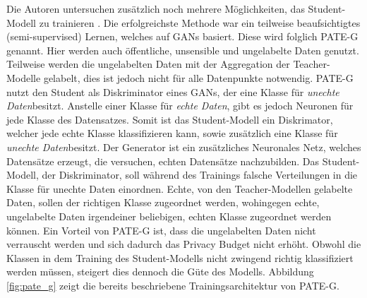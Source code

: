 Die Autoren untersuchen zusätzlich noch mehrere Möglichkeiten, das Student-Modell zu trainieren  \cite{P-57}.
Die erfolgreichste Methode war ein teilweise beaufsichtigtes (semi-supervised) Lernen, welches auf GANs basiert.
Diese wird folglich PATE-G genannt.
Hier werden auch öffentliche, unsensible und ungelabelte Daten genutzt.
Teilweise werden die ungelabelten Daten mit der Aggregation der Teacher-Modelle gelabelt, dies ist jedoch nicht für alle Datenpunkte notwendig.
PATE-G nutzt den Student als Diskriminator eines GANs, der eine Klasse für \dq \textit{unechte Daten}\dq besitzt. 
Anstelle einer Klasse für \dq \textit{echte Daten}\dq, gibt es jedoch Neuronen für jede Klasse des Datensatzes.
Somit ist das Student-Modell ein Diskrimator, welcher jede echte Klasse klassifizieren kann, sowie zusätzlich eine Klasse für \dq \textit{unechte Daten}\dq besitzt.
Der Generator ist ein zusätzliches Neuronales Netz, welches Datensätze erzeugt, die versuchen, echten Datensätze nachzubilden.
Das Student-Modell, der Diskriminator, soll während des Trainings falsche Verteilungen in die Klasse für unechte Daten einordnen.
Echte, von den Teacher-Modellen gelabelte Daten, sollen der richtigen Klasse zugeordnet werden, wohingegen echte, ungelabelte Daten irgendeiner beliebigen, echten Klasse zugeordnet werden können.
Ein Vorteil von PATE-G ist, dass die ungelabelten Daten nicht verrauscht werden und sich dadurch das Privacy Budget nicht erhöht.
Obwohl die Klassen in dem Training des Student-Modells nicht zwingend richtig klassifiziert werden müssen, steigert dies dennoch die Güte des Modells.
Abbildung \ref{fig:pate_g} zeigt die bereits beschriebene Trainingsarchitektur von PATE-G.






